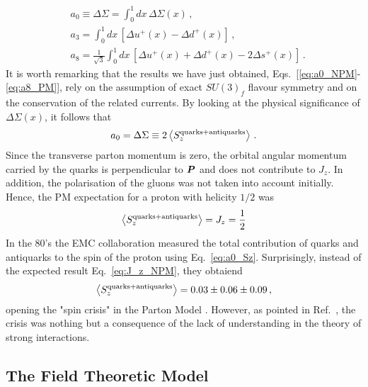 \begin{align}
  & a_0 \equiv \Delta \Sigma = \int_{0}^{1} dx \, \Delta \Sigma(x) \,, 
  \label{eq:a0_NPM}
  \\
  & a_3 = \int_{0}^{1} dx \, \left[ \Delta u^{+}(x) - \Delta d^{+}(x) \right] \,,
  \label{eq:a3_PM}
  \\
  & a_8 = \frac{1}{\sqrt{3}}\int_{0}^{1} dx \, \left[ \Delta u^{+}(x) + \Delta d^{+}(x) - 2 \Delta s^{+}(x) \right] \,.
  \label{eq:a8_PM}
\end{align}
It is worth remarking that the results we have just obtained, Eqs.~[\ref{eq:a0_NPM}-\ref{eq:a8_PM}], rely on the assumption of exact $SU(3)_f$ flavour symmetry and on the conservation of the related currents. By looking at the physical significance of $\Delta \Sigma (x)$, it follows that
\begin{equation}
  a_0 = \Delta \Sigma \equiv 2 \left< S_{z}^{\textrm{quarks} + \textrm{antiquarks}} \right> \,.
  \label{eq:a0_Sz}
\end{equation}
Since the transverse parton momentum is zero, the orbital angular momentum carried by the quarks is perpendicular to $\vb*{P}$ and does not contribute to $J_{z}$. In addition, the polarisation of the gluons was not taken into account initially. Hence, the PM expectation for a proton with helicity $1/2$ was 
\begin{equation}
  \left< S_{z}^{\textrm{quarks} + \textrm{antiquarks}} \right> = J_{z} = \frac{1}{2}
  \label{eq:J_z_NPM}
\end{equation}
In the 80's the EMC collaboration measured the total contribution of quarks and antiquarks to the spin of the proton \cite{EuropeanMuon:1989yki} using Eq.~\eqref{eq:a0_Sz}. Surprisingly, instead of the expected result Eq.~\eqref{eq:J_z_NPM}, they obtaiend
\begin{equation}
  \left< S_{z}^{\textrm{quarks} + \textrm{antiquarks}} \right> = 0.03 \pm 0.06 \pm 0.09 \,,
  \label{eq:EMC_exp}
\end{equation}
opening the "spin crisis" in the Parton Model \cite{Leader_Anselmino}. However, as pointed in Ref.~\cite{Leader:2016sli}, the  crisis was nothing but a consequence of the lack of understanding in the theory of strong interactions. 

\subsection{The Field Theoretic Model}
\label{sec:field_theoretic}

